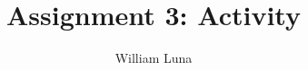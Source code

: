 \documentclass[
	letterpaper, %
]{jdf}
\author{William Luna}
\title{Assignment 3: Activity}
\newcommand{\pcite}[1]{(\cite{#1})}
\begin{document}
\newcommand{\pcite}[1]{(\cite{#1})}

\maketitle



\end{document}
